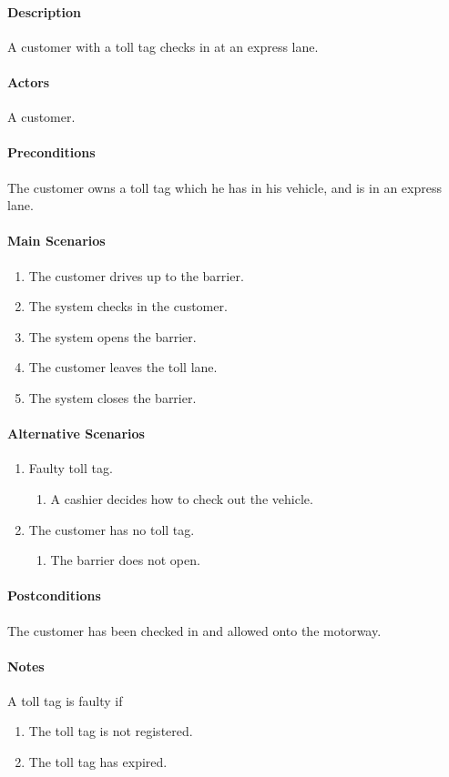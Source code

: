 \paragraph{Description }

A customer with a toll tag checks in at an express lane.


\paragraph{Actors}

A customer.


\paragraph{Preconditions}

The customer owns a toll tag which he has in his vehicle, and is in
an express lane.


\paragraph{Main Scenarios}
\begin{enumerate}
\item The customer drives up to the barrier.
\item The system checks in the customer.
\item The system opens the barrier.
\item The customer leaves the toll lane.
\item The system closes the barrier.
\end{enumerate}

\paragraph{Alternative Scenarios}
\begin{enumerate}
\item Faulty toll tag.

\begin{enumerate}
\item A cashier decides how to check out the vehicle.
\end{enumerate}
\item The customer has no toll tag.

\begin{enumerate}
\item The barrier does not open.
\end{enumerate}
\end{enumerate}

\paragraph{Postconditions}

The customer has been checked in and allowed onto the motorway.


\paragraph{Notes}

A toll tag is faulty if
\begin{enumerate}
\item The toll tag is not registered.
\item The toll tag has expired.\end{enumerate}


